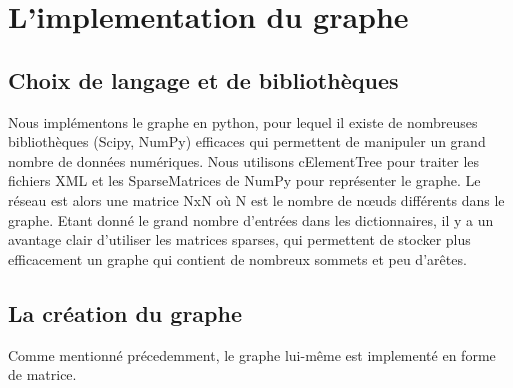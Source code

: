 \section{L'implementation du graphe}

\subsection{Choix de langage et de bibliothèques}
Nous implémentons le graphe en python, pour lequel il existe de nombreuses 
bibliothèques (Scipy, NumPy) efficaces qui permettent de manipuler un grand 
nombre de données numériques. Nous utilisons cElementTree pour traiter les 
fichiers XML et les SparseMatrices de NumPy pour représenter le graphe. Le 
réseau est alors une matrice NxN où N est le nombre de nœuds différents dans le 
graphe. Etant donné le grand nombre d'entrées dans les dictionnaires, il y a un 
avantage clair d'utiliser les matrices sparses, qui permettent de stocker plus 
efficacement un graphe qui contient de nombreux sommets et peu d'arêtes.



\subsection{La création du graphe}
Comme mentionné précedemment, le graphe lui-même est implementé en forme de 
matrice.

